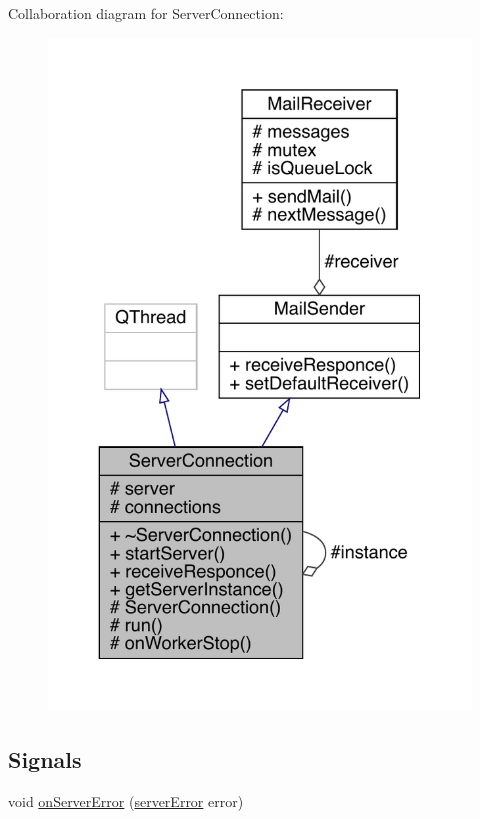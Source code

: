 Collaboration diagram for Server\+Connection\+:
\nopagebreak
\begin{figure}[H]
\begin{center}
\leavevmode
\includegraphics[width=329pt]{db/dd9/a00179}
\end{center}
\end{figure}
\subsection*{Signals}
\begin{DoxyCompactItemize}
\item 
void \hyperlink{a00181_ae97f8eaa15a3da8f069ad502e89039ae}{on\+Server\+Error} (\hyperlink{a00104_a65727a063024ff0dedf1ac2f087f4165}{server\+Error} error)
\end{DoxyCompactItemize}
